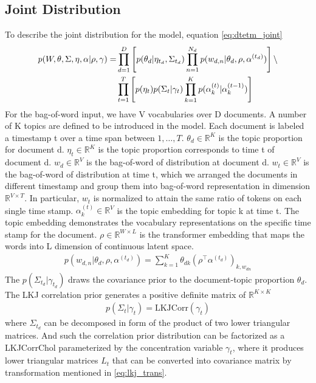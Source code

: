 \subsection{Joint Distribution}
To describe the joint distribution for the model, equation \ref{eq:dtetm_joint}
\begin{align}\label{eq:dtetm_joint}
p(W,\theta,\Sigma,\eta,\alpha|\rho,\gamma)=&\prod_{d=1}^{D}\left[p(\theta_d|\eta_{t_d},\Sigma_{t_d})\prod_{n=1}^{N_d}p(w_{d,n}|\theta_d,\rho,\alpha^{(t_d)})\right]\backslash\notag\\
&\prod_{t=1}^{T}\left[p(\eta_{t})p(\Sigma_{t}|\gamma_t)\prod_{k=1}^{K}p(\alpha_k^{(t)}|\alpha_k^{(t-1)})\right]
\end{align}
For the bag-of-word input, we have V vocabularies over D documents. A number of K topics are defined to be introduced in the model. Each document is labeled a timestamp t over a time span between $ 1,\dots,T $.
$\theta_d\in\mathbb{R}^{K}$ is the topic proportion for document d.
$\eta_{t}\in\mathbb{R}^{K}$ is the topic proportion corresponds to time t of document d.	
$ w_d \in\mathbb{R}^{V}$ is the bag-of-word of distribution at document d.
$ w_t \in\mathbb{R}^{V}$ is the bag-of-word of distribution at time t, which we arranged the documents in different timestamp and group them into bag-of-word representation in dimension $ \mathbb{R}^{V\times T} $. In particular, $ w_t $ is normalized to attain the same ratio of tokens on each single time stamp.
$\alpha_k^{(t)}\in\mathbb{R}^{V}$ is the topic embedding for topic k at time t. The topic embedding demonstrates the vocabulary representations on the specific time stamp for the document.
$ \rho\in\mathbb{R}^{W\times L} $ is the transformer embedding that maps the words into L dimension of continuous latent space. 
\begin{align}
p(w_{d,n}|\theta_d,\rho,\alpha^{(t_d)})=\sum_{k=1}^{K}\theta_{dk}(\rho^\top\alpha^{(t_d)})_{k,w_{dn}}
\end{align}
The $ p(\Sigma_{t_d}|\gamma_{t_d}) $ draws the covariance prior to the document-topic proportion $ \theta_d $. The LKJ correlation prior generates a positive definite matrix of $ \mathbb{R}^{K\times K} $
\begin{align}
p(\Sigma_{t}|\gamma_{t})=\text{LKJCorr}(\gamma_{t})
\end{align}
where $\Sigma_{t_d}$ can be decomposed in form of the product of two lower triangular matrices. And such the correlation prior distribution can be factorized as a LKJCorrChol parameterized by the concentration variable $ \gamma_{t} $, where it produces lower triangular matrices $ L_{t} $ that can be converted into covariance matrix by transformation mentioned in \ref{eq:lkj_trans}.
